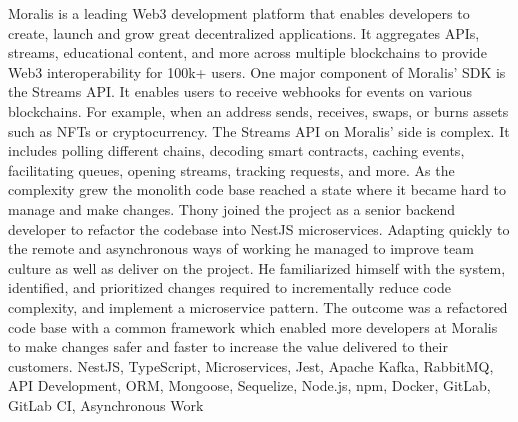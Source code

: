 \begin{experiences}
{        Moralis is a leading Web3 development platform that enables developers to create, launch and grow great decentralized applications. 
        It aggregates APIs, streams, educational content, and more across multiple blockchains to provide Web3 interoperability for 100k+ users.
        \newline \newline
        One major component of Moralis' SDK is the Streams API. 
        It enables users to receive webhooks for events on various blockchains. 
        For example, when an address sends, receives, swaps, or burns assets such as NFTs or cryptocurrency.
        \newline \newline
        The Streams API on Moralis' side is complex.
        It includes polling different chains, decoding smart contracts, caching events, facilitating queues, opening streams, tracking requests, and more.
        As the complexity grew the monolith code base reached a state where it became hard to manage and make changes.
        \newline \newline
        Thony joined the project as a senior backend developer to refactor the codebase into NestJS microservices.
        Adapting quickly to the remote and asynchronous ways of working he managed to improve team culture as well as deliver on the project.
        He familiarized himself with the system, identified, and prioritized changes required to incrementally reduce code complexity, and implement a microservice pattern. 
        The outcome was a refactored code base with a common framework which enabled more developers at Moralis to make changes safer and faster to increase the value delivered to their customers.
        \newline
    }
    {NestJS, TypeScript, Microservices, Jest, Apache Kafka, RabbitMQ, API
Development, ORM, Mongoose, Sequelize, Node.js, npm, Docker, GitLab, GitLab CI,
Asynchronous Work}
    \emptySeparator
    

\end{experiences}
